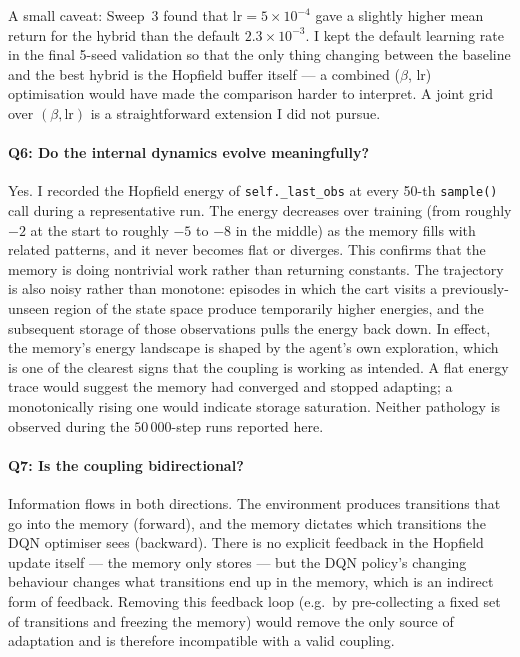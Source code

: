 \documentclass[a4paper,11pt]{article}
\begin{document}
A small caveat: Sweep~3 found that $\mathrm{lr} = 5\!\times\!10^{-4}$
gave a slightly higher mean return for the hybrid than the default
$2.3\!\times\!10^{-3}$. I kept the default learning rate in the
final 5-seed validation so that the only thing changing between the
baseline and the best hybrid is the Hopfield buffer itself --- a
combined ($\beta$, lr) optimisation would have made the comparison
harder to interpret. A joint grid over $(\beta, \mathrm{lr})$ is a
straightforward extension I did not pursue.

\paragraph{Q6: Do the internal dynamics evolve meaningfully?}
Yes. I recorded the Hopfield energy of \texttt{self.\_last\_obs} at every
50-th \texttt{sample()} call during a representative run. The energy
decreases over training (from roughly $-2$ at the start to roughly $-5$
to $-8$ in the middle) as the memory fills with related patterns, and it
never becomes flat or diverges. This confirms that the memory is doing
nontrivial work rather than returning constants. The trajectory is also
noisy rather than monotone: episodes in which the cart visits a
previously-unseen region of the state space produce temporarily higher
energies, and the subsequent storage of those observations pulls the
energy back down. In effect, the memory's energy landscape is shaped by
the agent's own exploration, which is one of the clearest signs that
the coupling is working as intended. A flat energy trace would suggest
the memory had converged and stopped adapting; a monotonically rising
one would indicate storage saturation. Neither pathology is observed
during the $50\,000$-step runs reported here.

\paragraph{Q7: Is the coupling bidirectional?}
Information flows in both directions. The environment produces
transitions that go into the memory (forward), and the memory dictates
which transitions the DQN optimiser sees (backward). There is no explicit
feedback in the Hopfield update itself --- the memory only stores --- but
the DQN policy's changing behaviour changes what transitions end up in
the memory, which is an indirect form of feedback. Removing this
feedback loop (e.g.\ by pre-collecting a fixed set of transitions and
freezing the memory) would remove the only source of adaptation and is
therefore incompatible with a valid coupling.
\end{document}
